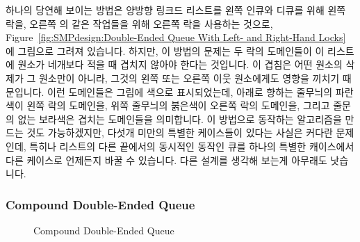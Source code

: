 하나의 당연해 보이는 방법은 양방향 링크드 리스트를 왼쪽 인큐와 디큐를 위해 왼쪽
락을, 오른쪽 의 같은 작업들을 위해 오른쪽 락을 사용하는 것으로,
Figure~\ref{fig:SMPdesign:Double-Ended Queue With Left- and Right-Hand Locks}
에 그림으로 그려져 있습니다.
하지만, 이 방법의 문제는 두 락의 도메인들이 이 리스트에 원소가 네개보다 적을 때
겹치지 않아야 한다는 것입니다.
이 겹침은 어떤 원소의 삭제가 그 원소만이 아니라, 그것의 왼쪽 또는 오른쪽 이웃
원소에게도 영향을 끼치기 때문입니다.
이런 도메인들은 그림에 색으로 표시되었는데, 아래로 향하는 줄무늬의 파란색이
왼쪽 락의 도메인을, 위쪽 줄무늬의 붉은색이 오른쪽 락의 도메인을, 그리고 줄문의
없는 보라색은 겹치는 도메인들을 의미합니다.
이 방법으로 동작하는 알고리즘을 만드는 것도 가능하겠지만, 다섯개 미만의 특별한
케이스들이 있다는 사실은 커다란 문제인데, 특히나 리스트의 다른 끝에서의
동시적인 동작인 큐를 하나의 특별한 캐이스에서 다른 케이스로 언제든지 바꿀 수
있습니다.
다른 설계를 생각해 보는게 아무래도 낫습니다.

\subsubsection{Compound Double-Ended Queue}
\label{sec:SMPdesign:Compound Double-Ended Queue}

\begin{figure}[tb]
\centering
{}
\caption{Compound Double-Ended Queue}
\label{fig:SMPdesign:Compound Double-Ended Queue}
\end{figure}

